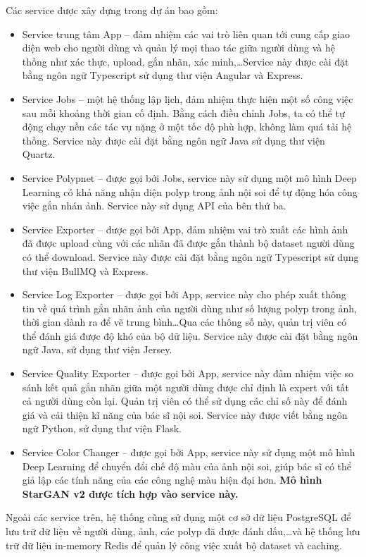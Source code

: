 \documentclass[12pt]{extreport}
\begin{document}
Các service được xây dựng trong dự án bao gồm:
\begin{itemize}
    \item Service trung tâm App – đảm nhiệm các vai trò liên quan tới cung cấp giao diện web cho người dùng và quản lý mọi thao tác giữa người dùng và hệ thống như xác thực, upload, gắn nhãn, xác minh,\dots Service này được cài đặt bằng ngôn ngữ Typescript sử dụng thư viện Angular và Express.
    \item Service Jobs – một hệ thống lập lịch, đảm nhiệm thực hiện một số công việc sau mỗi khoảng thời gian cố định. Bằng cách điều chỉnh Jobs, ta có thể tự động chạy nền các tác vụ nặng ở một tốc độ phù hợp, không làm quá tải hệ thống. Service này được cài đặt bằng ngôn ngữ Java sử dụng thư viện Quartz.
    \item Service Polypnet – được gọi bởi Jobs, service này sử dụng một mô hình Deep Learning có khả năng nhận diện polyp trong ảnh nội soi để tự động hóa công việc gắn nhán ảnh. Service này sử dụng API của bên thứ ba.
    \item Service Exporter – được gọi bởi App, đảm nhiệm vai trò xuất các hình ảnh đã được upload cùng với các nhãn đã được gắn thành bộ dataset người dùng có thể download. Service này được cài đặt bằng ngôn ngữ Typescript sử dụng thư viện BullMQ và Express.
    \item Service Log Exporter – được gọi bởi App, service này cho phép xuất thông tin về quá trình gắn nhãn ảnh của người dùng như số lượng polyp trong ảnh, thời gian dành ra để vẽ trung bình\dots Qua các thông số này, quản trị viên có thể đánh giá được độ khó của bộ dữ liệu. Service này được cài đặt bằng ngôn ngữ Java, sử dụng thư viện Jersey.
    \item Service Quality Exporter – được gọi bởi App, service này đảm nhiệm việc so sánh kết quả gắn nhãn giữa một người dùng được chỉ định là expert với tất cả người dùng còn lại. Quản trị viên có thể sử dụng các chỉ số này để đánh giá và cải thiện kĩ năng của bác sĩ nội soi. Service này được viết bằng ngôn ngữ Python, sử dụng thư viện Flask.
    \item Service Color Changer – được gọi bởi App, service này sử dụng một mô hình Deep Learning để chuyển đổi chế độ màu của ảnh nội soi, giúp bác sĩ có thể giả lập các tính năng của các công nghệ màu hiện đại hơn. \textbf{Mô hình StarGAN v2 được tích hợp vào service này.}
\end{itemize}

Ngoài các service trên, hệ thống cũng sử dụng một cơ sở dữ liệu PostgreSQL để lưu trữ dữ liệu về người dùng, ảnh, các polyp đã được đánh dấu,\dots và hệ thống lưu trữ dữ liệu in-memory Redis để quản lý công việc xuất bộ dataset và caching.
\end{document}
